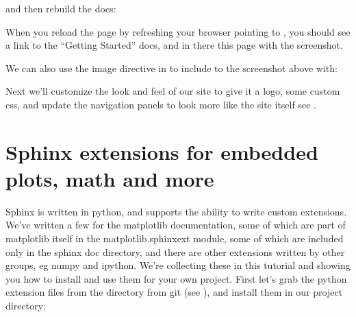 \documentclass[letterpaper,10pt,english]{sphinxmanual}
\begin{document}
\begin{sphinxVerbatim}[commandchars=\\\{\}]

 
    

\end{sphinxVerbatim}

\sphinxAtStartPar
and then rebuild the docs:

\begin{sphinxVerbatim}[commandchars=\\\{\}]
 
 
\end{sphinxVerbatim}

\sphinxAtStartPar
When you reload the page by refreshing your browser pointing to
, you should see a link to the
“Getting Started” docs, and in there this page with the screenshot.

\sphinxAtStartPar
We can also use the image directive in  to include to the screenshot above
with:

\begin{sphinxVerbatim}[commandchars=\\\{\}]
 
\end{sphinxVerbatim}

\sphinxAtStartPar
Next we’ll customize the look and feel of our site to give it a logo,
some custom css, and update the navigation panels to look more like
the  site itself \textendash{} see
.


\chapter{Sphinx extensions for embedded plots, math and more}
\label{\detokenize{chapter2:sphinx-extensions-for-embedded-plots-math-and-more}}\label{\detokenize{chapter2:extensions}}\label{\detokenize{chapter2::doc}}
\sphinxAtStartPar
Sphinx is written in python, and supports the ability to write custom
extensions.  We’ve written a few for the matplotlib documentation,
some of which are part of matplotlib itself in the
matplotlib.sphinxext module, some of which are included only in the
sphinx doc directory, and there are other extensions written by other
groups, eg numpy and ipython.  We’re collecting these in this tutorial
and showing you how to install and use them for your own project.
First let’s grab the python extension files from the 
directory from git (see {\hyperref[\detokenize{chapter1:fetching-the-data}]{}}), and install them in
our  project  directory:
\end{document}
